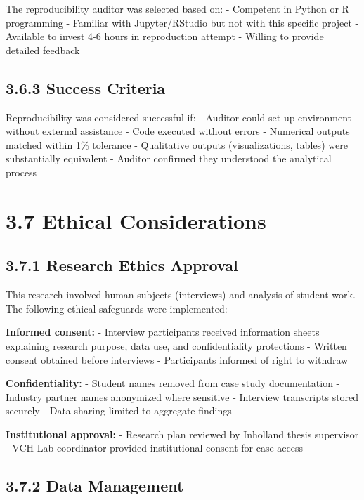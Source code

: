 \documentclass[
  oneside,
  open=any]{scrbook}
\begin{document}
The reproducibility auditor was selected based on: - Competent in Python
or R programming - Familiar with Jupyter/RStudio but not with this
specific project - Available to invest 4-6 hours in reproduction attempt
- Willing to provide detailed feedback

\subsection{3.6.3 Success Criteria}\label{success-criteria}

Reproducibility was considered successful if: - Auditor could set up
environment without external assistance - Code executed without errors -
Numerical outputs matched within 1\% tolerance - Qualitative outputs
(visualizations, tables) were substantially equivalent - Auditor
confirmed they understood the analytical process

\section{3.7 Ethical Considerations}\label{ethical-considerations}

\subsection{3.7.1 Research Ethics
Approval}\label{research-ethics-approval}

This research involved human subjects (interviews) and analysis of
student work. The following ethical safeguards were implemented:

\textbf{Informed consent:} - Interview participants received information
sheets explaining research purpose, data use, and confidentiality
protections - Written consent obtained before interviews - Participants
informed of right to withdraw

\textbf{Confidentiality:} - Student names removed from case study
documentation - Industry partner names anonymized where sensitive -
Interview transcripts stored securely - Data sharing limited to
aggregate findings

\textbf{Institutional approval:} - Research plan reviewed by Inholland
thesis supervisor - VCH Lab coordinator provided institutional consent
for case access

\subsection{3.7.2 Data Management}\label{data-management}
\end{document}
